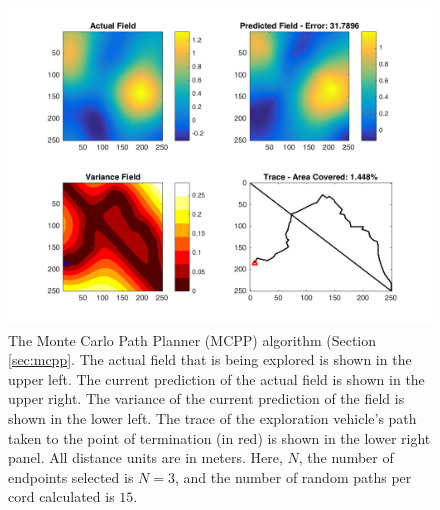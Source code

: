 

\begin{figure}[htb!]
	\centering
	\includegraphics[width=0.95\linewidth]{figures/mc_4panel.png}
	\captionsetup{skip=0.20\baselineskip}
	\ssp
	\caption{The Monte Carlo Path Planner (MCPP) algorithm (Section \ref{sec:mcpp}. The actual field that is being explored is shown in the upper left. The current prediction of the actual field is shown in the upper right. The variance of the current prediction of the field is shown in the lower left. The trace of the exploration vehicle's path taken to the point of termination (in red) is shown in the lower right panel. All distance units are in meters. Here, $N$, the number of endpoints selected is $N=3$, and the number of random paths per cord calculated is $15$.}
	\label{fig:mcpp}
\end{figure}
\clearpage

